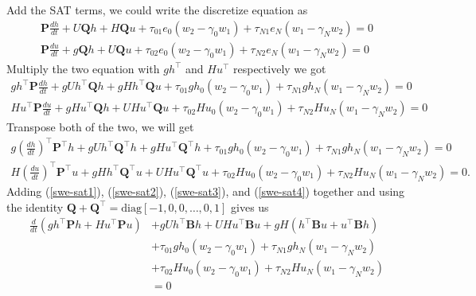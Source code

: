 \documentclass{article}
\theoremstyle{definition}
\begin{document}
    Add the SAT terms, we could write the discretize equation as 
    \begin{align}
        \mathbf{P} \frac{dh}{dt} + U\mathbf{Q} h + H\mathbf{Q}u 
            + \tau_{01} e_0 \left(w_2 - \gamma_0 w_1 \right)
            + \tau_{N1} e_N \left(w_1 - \gamma_N w_2 \right)
            = 0\\
        \mathbf{P} \frac{du}{dt} + g\mathbf{Q}h + U\mathbf{Q}u 
        + \tau_{02} e_0 \left(w_2 - \gamma_0 w_1 \right)
        + \tau_{N2} e_N \left(w_1 - \gamma_N w_2 \right)
        = 0
    \end{align}
    Multiply the two equation with $gh^\top$ and $Hu^\top$ respectively we got
    \begin{align}\label{swe-sat1}
        gh^\top \mathbf{P} \frac{dh}{dt} + gUh^\top \mathbf{Q} h + gHh^\top \mathbf{Q}u 
            + \tau_{01} gh_0 \left(w_2 - \gamma_0 w_1 \right)
            + \tau_{N1} gh_N \left(w_1 - \gamma_N w_2 \right)
            = 0\\ \label{swe-sat2}
        Hu^\top \mathbf{P} \frac{du}{dt} + gHu^\top \mathbf{Q}h + UHu^\top \mathbf{Q}u 
        + \tau_{02} Hu_0 \left(w_2 - \gamma_0 w_1 \right)
        + \tau_{N2} Hu_N \left(w_1 - \gamma_N w_2 \right)
        = 0
    \end{align}
    Transpose both of the two, we will get 
    \begin{align} \label{swe-sat3}
        g\left(\frac{dh}{dt}\right)^\top \mathbf{P}^\top h  
            + gU h^\top  \mathbf{Q}^\top h + gHu^\top \mathbf{Q}^\top h 
                + \tau_{01} gh_0 \left(w_2 - \gamma_0 w_1 \right)
                + \tau_{N1} gh_N \left(w_1 - \gamma_N w_2 \right)
            = 0\\ \label{swe-sat4}
        H \left(\frac{du}{dt}\right)^\top \mathbf{P}^\top u  
            + gHh^\top \mathbf{Q}^\top u + UHu^\top \mathbf{Q}^\top u 
                + \tau_{02} Hu_0 \left(w_2 - \gamma_0 w_1 \right)
                + \tau_{N2} Hu_N \left(w_1 - \gamma_N w_2 \right)
            = 0.
    \end{align}
    Adding (\ref{swe-sat1}), (\ref{swe-sat2}), (\ref{swe-sat3}), and (\ref{swe-sat4}) together
    and using the identity     $\mathbf{Q+Q^\top} = \textrm{diag}[-1,0,0,\dots,0,1]$
    gives us 
    \begin{align}
        \frac{d}{dt}\left(gh^\top \mathbf{P}h + H u^\top \mathbf{P}u \right) 
            &+ gUh^\top \mathbf{B} h + UHu^\top \mathbf{B} u 
            + gH \left(h^\top \mathbf{B}u + u^\top \mathbf{B}h \right) \nonumber \\
            &+ \tau_{01} gh_0 \left(w_2 - \gamma_0 w_1 \right)
            + \tau_{N1} gh_N \left(w_1 - \gamma_N w_2 \right) \nonumber \\
            &+ \tau_{02} Hu_0 \left(w_2 - \gamma_0 w_1 \right)
            + \tau_{N2} Hu_N \left(w_1 - \gamma_N w_2 \right) \nonumber \\
            &=0 
    \end{align}
\end{document}

